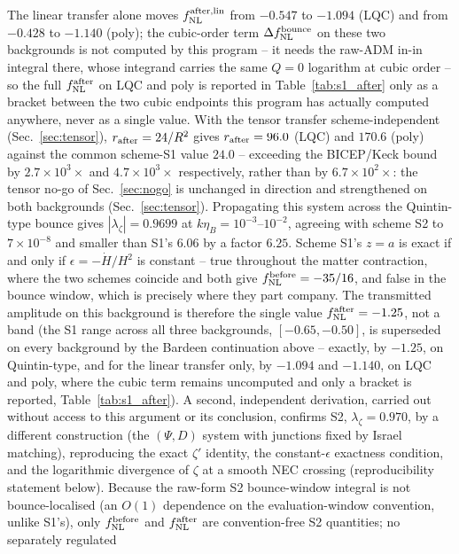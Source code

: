 \documentclass[aps,prd,twocolumn,superscriptaddress,nofootinbib,longbibliography]{revtex4-2}
\newcommand{\fnl}{f_{\rm NL}}
\begin{document}
The linear transfer alone moves $\fnl^{\rm after,lin}$ from $-0.547$ to
$-1.094$ (LQC) and from $-0.428$ to $-1.140$ (poly); the cubic-order term
$\Delta\fnl^{\rm bounce}$ on these two backgrounds is not computed by
this program -- it needs the raw-ADM in-in integral there, whose
integrand carries the same $Q=0$ logarithm at cubic order -- so the full
$\fnl^{\rm after}$ on LQC and poly is reported in
Table~\ref{tab:s1_after} only as a bracket between the two cubic
endpoints this program has actually computed anywhere, never as a single
value. With the tensor transfer scheme-independent
(Sec.~\ref{sec:tensor}), $r_{\rm after}=24/R^2$ gives $r_{\rm
after}=96.0$ (LQC) and $170.6$ (poly) against the common scheme-S1 value
$24.0$ -- exceeding the BICEP/Keck bound by $2.7\times10^3\times$ and
$4.7\times10^3\times$ respectively, rather than by $6.7\times10^2\times$:
the tensor no-go of Sec.~\ref{sec:nogo} is unchanged in direction and
strengthened on both backgrounds (Sec.~\ref{sec:tensor}). Propagating
this system across the Quintin-type bounce gives $|\lambda_\zeta|=0.9699$
at $k\eta_B=10^{-3}$--$10^{-2}$, agreeing with scheme S2 to
$7\times10^{-8}$ and smaller than S1's $6.06$ by a factor $6.25$. Scheme S1's
$z=a$ is exact if and only if $\epsilon=-\dot H/H^2$ is constant -- true
throughout the matter contraction, where the two schemes coincide and both
give $\fnl^{\rm before}=-35/16$, and false in the bounce window, which is
precisely where they part company. The transmitted amplitude on this
background is therefore the single value $\fnl^{\rm after}=-1.25$, not a
band (the S1 range across all three backgrounds, $[-0.65,-0.50]$, is
superseded on every background by the Bardeen continuation above --
exactly, by $-1.25$, on Quintin-type, and for the linear transfer only,
by $-1.094$ and $-1.140$, on LQC and poly, where the cubic term remains
uncomputed and only a bracket is reported, Table~\ref{tab:s1_after}). A
second, independent
derivation, carried out without access to this argument or its conclusion, confirms
S2, $\lambda_\zeta=0.970$, by a different construction (the $(\Psi,D)$
system with junctions fixed by Israel matching), reproducing the exact
$\zeta'$ identity, the constant-$\epsilon$ exactness condition, and the
logarithmic divergence of $\zeta$ at a smooth NEC crossing
(reproducibility statement below). Because the raw-form S2 bounce-window integral is not
bounce-localised (an $O(1)$ dependence on the evaluation-window convention,
unlike S1's), only $\fnl^{\rm before}$ and $\fnl^{\rm after}$ are
convention-free S2 quantities; no separately regulated
\end{document}
